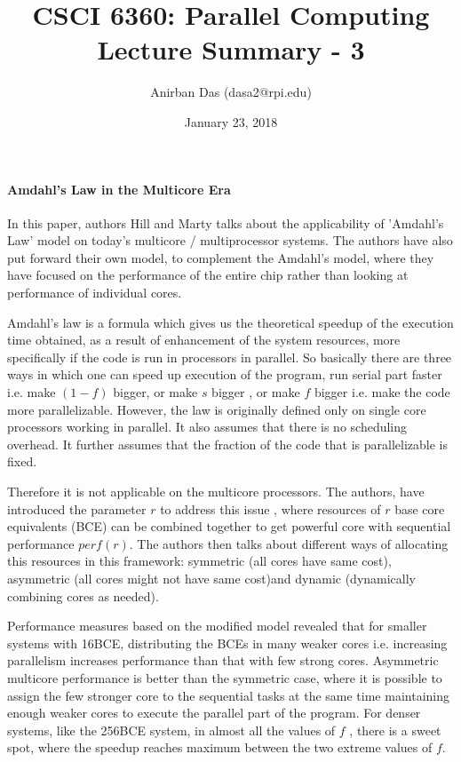 \documentclass[a4paper,12 pt]{article}
\title{\vspace{-2.0cm}CSCI 6360: Parallel Computing Lecture Summary - 3}
\author{Anirban Das (dasa2@rpi.edu) }
\date{January 23, 2018}
\begin{document}
\maketitle

\paragraph{Amdahl's Law in the Multicore Era\\}

In this paper, authors Hill and Marty talks about the applicability of 'Amdahl's Law' model on today's multicore / multiprocessor systems. The authors have also put forward their own model, to complement the Amdahl's model, where they have focused on the performance of the entire chip rather than looking at performance of individual cores.

Amdahl's law is a formula which gives us the theoretical speedup of the execution time obtained, as a result of enhancement of the system resources, more specifically if the code is run in processors in parallel. So basically there are three ways in which one can speed up execution of the program, run serial part faster i.e. make $(1-f)$ bigger, or make $s$ bigger , or make $f$ bigger i.e. make the code more parallelizable. However, the law is originally defined only on single core processors working in parallel. It also assumes that there is no scheduling overhead. It further assumes that the fraction of the code that is parallelizable is fixed. 

Therefore it is not applicable on the multicore processors. The authors, have introduced the parameter $r$ to address this issue , where resources of $r$ base core equivalents (BCE) can be combined together to get powerful core with sequential performance $perf(r)$. The authors then talks about different ways of allocating this resources in this framework: symmetric (all cores have same cost), asymmetric (all cores might not have same cost)and dynamic (dynamically combining cores as needed). 

Performance measures based on the modified model revealed that for smaller systems with 16BCE, distributing the BCEs in many weaker cores i.e. increasing parallelism increases performance than that with few strong cores. Asymmetric multicore performance is better than the symmetric case, where it is possible to assign the few stronger core to the sequential tasks at the same time maintaining enough weaker cores to execute the parallel part of the program. For denser systems, like the 256BCE system, in almost all the values of $f$ , there is a sweet spot, where the speedup reaches maximum between the two extreme values of $f$. 
\end{document}
